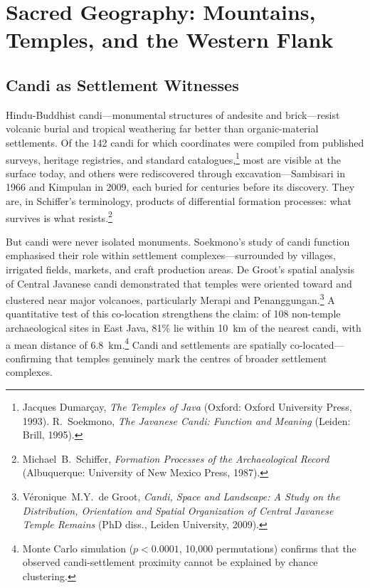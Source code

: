 \documentclass[12pt,a4paper]{article}
\begin{document}
\section{Sacred Geography: Mountains, Temples, and the Western Flank}

\subsection{Candi as Settlement Witnesses}

Hindu-Buddhist candi---monumental structures of andesite and brick---resist volcanic burial and tropical weathering far better than organic-material settlements.
Of the 142 candi for which coordinates were compiled from published surveys, heritage registries, and standard catalogues,\footnote{Jacques Dumar\c{c}ay, \emph{The Temples of Java} (Oxford: Oxford University Press, 1993). R.\ Soekmono, \emph{The Javanese Candi: Function and Meaning} (Leiden: Brill, 1995).} most are visible at the surface today, and others were rediscovered through excavation---Sambisari in 1966 and Kimpulan in 2009, each buried for centuries before its discovery.
They are, in Schiffer's terminology, products of differential formation processes: what survives is what resists.\footnote{Michael~B.\ Schiffer, \emph{Formation Processes of the Archaeological Record} (Albuquerque: University of New Mexico Press, 1987).}

But candi were never isolated monuments.
Soekmono's study of candi function emphasised their role within settlement complexes---surrounded by villages, irrigated fields, markets, and craft production areas.
De Groot's spatial analysis of Central Javanese candi demonstrated that temples were oriented toward and clustered near major volcanoes, particularly Merapi and Penanggungan.\footnote{V\'{e}ronique~M.Y.\ de Groot, \emph{Candi, Space and Landscape: A Study on the Distribution, Orientation and Spatial Organization of Central Javanese Temple Remains} (PhD diss., Leiden University, 2009).}
A quantitative test of this co-location strengthens the claim: of 108 non-temple archaeological sites in East Java, 81\% lie within 10~km of the nearest candi, with a mean distance of 6.8~km.\footnote{Monte Carlo simulation ($p < 0.0001$, 10,000 permutations) confirms that the observed candi-settlement proximity cannot be explained by chance clustering.}
Candi and settlements are spatially co-located---confirming that temples genuinely mark the centres of broader settlement complexes.
\end{document}
